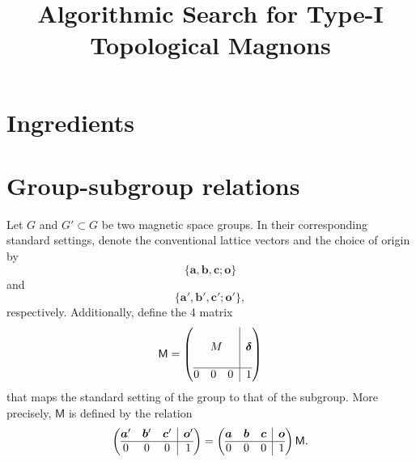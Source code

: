 \documentclass[12pt, a4paper]{article}
\begin{document}
\title{Algorithmic Search for Type-I Topological Magnons}
\maketitle

\section{Ingredients}
\section{Group-subgroup relations}
Let $G$ and $G'\subset G$ be two magnetic space groups. In their corresponding standard settings, denote the conventional lattice vectors and the choice of origin by
\begin{equation}
  \{\bm{a}, \bm{b},\bm{c}; \bm{o}\}
\end{equation} 
and
\begin{equation}
  \{\bm{a}', \bm{b}',\bm{c}'; \bm{o}'\},
\end{equation} 
respectively. Additionally, define the 4 matrix
\begin{equation}\label{sfMblocks}
  \mathsf{M}=
  \left(
  \begin{array}{@{}c|c@{}}
    \begin{matrix}
      \phantom{0}&& \\
      &M& \\
      \phantom{0}&& 
    \end{matrix}&\bm{\delta}\\
    \hline
    \begin{matrix}
      0&0&0
    \end{matrix}&1
  \end{array}
  \right)
\end{equation} 
that maps the standard setting of the group to that of the subgroup. More precisely, $\mathsf{M}$ is defined by the relation
\begin{equation}\label{subgroupToGroupTranslations}
  \left(
  \begin{array}{@{}ccc|c@{}}
    \bm{a}'&\bm{b}'&\bm{c}' &\bm{o}' \\
    \hline
      0&0&0&1
  \end{array}
  \right)
  =
  \left(
  \begin{array}{@{}ccc|c@{}}
      \bm{a}&\bm{b}&\bm{c}&\bm{o}\\
    \hline
      0&0&0&1
  \end{array}
  \right)
  \mathsf{M}.
\end{equation} 
\end{document}
